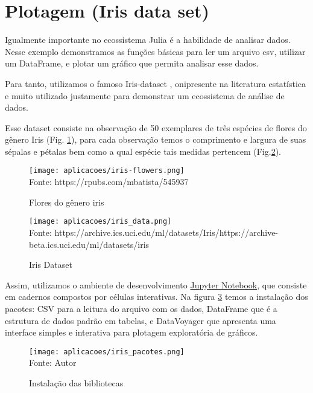 \section{Plotagem (Iris data set)}
Igualmente importante no ecossistema Julia é a habilidade de analisar dados. Nesse exemplo demonstramos as funções básicas para ler um arquivo csv, utilizar um DataFrame, e plotar um gráfico que permita analisar esse dados. 

Para tanto, utilizamos o famoso Iris-dataset \cite{Fisher1936}, onipresente na literatura estatística e muito utilizado justamente para demonstrar um ecossistema de análise de dados. 

Esse dataset consiste na observação de 50 exemplares de três espécies de flores do gênero Iris (Fig. \ref{iris_flowers}), para cada observação temos o comprimento e largura de suas sépalas e pétalas bem como a qual espécie tais medidas pertencem (Fig.\ref{iris_data}).

\begin{figure}[H]
   \begin{center}
       \caption{Flores do gênero iris} \label{iris_flowers}
       \texttt{[image: aplicacoes/iris-flowers.png]} \\
       {\tiny \sf Fonte: https://rpubs.com/mbatista/545937}
   \end{center}
\end{figure}

\begin{figure}[H]
   \begin{center}
       \caption{Iris Dataset} \label{iris_data}
       \texttt{[image: aplicacoes/iris\_data.png]} \\
       {\tiny \sf Fonte: https://archive.ics.uci.edu/ml/datasets/Iris/https://archive-beta.ics.uci.edu/ml/datasets/iris}
   \end{center}
\end{figure}

Assim, utilizamos o ambiente de desenvolvimento \href{https://jupyter.org/}{Jupyter Notebook}, que consiste em cadernos compostos por células interativas. 
Na figura \ref{iris_pacotes} temos a instalação dos pacotes: CSV para a leitura do arquivo com os dados, DataFrame que é a estrutura de dados padrão em tabelas, e DataVoyager que apresenta uma interface simples e interativa para plotagem exploratória de gráficos.

\begin{figure}[H]
   \begin{center}
       \caption{Instalação das bibliotecas} \label{iris_pacotes}
       \texttt{[image: aplicacoes/iris\_pacotes.png]} \\
       {\tiny \sf Fonte: Autor}
   \end{center}
\end{figure}

